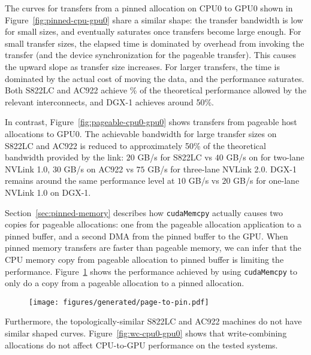 The curves for transfers from a pinned allocation on CPU0 to GPU0 shown in Figure~\ref{fig:pinned-cpu-gpu0} share a similar shape: the transfer bandwidth is low for small sizes, and eventually saturates once transfers become large enough.
For small transfer sizes, the elapsed time is dominated by overhead from invoking the transfer (and the device synchronization for the pageable transfer).
This causes the upward slope as transfer size increases.
For larger transfers, the time is dominated by the actual cost of moving the data, and the performance saturates.
Both S822LC and AC922 achieve \% of the theoretical performance allowed by the relevant interconnects, and DGX-1 achieves around 50\%.


In contrast, Figure~\ref{fig:pageable-cpu0-gpu0} shows transfers from pageable host allocations to GPU0.
The achievable bandwidth for large transfer sizes on S822LC and AC922 is reduced to approximately 50\% of the theoretical bandwidth provided by the link: $20$ GB/s for S822LC vs $40$ GB/s on for two-lane NVLink 1.0, $30$ GB/s on AC922 vs $75$ GB/s for three-lane NVLink 2.0.
DGX-1 remains around the same performance level at $10$ GB/s vs $20$ GB/s for one-lane NVLink 1.0 on DGX-1.

Section~\ref{sec:pinned-memory} describes how \texttt{cudaMemcpy} actually causes two copies for pageable allocations: one from the pageable allocation application to a pinned buffer, and a second DMA from the pinned buffer to the GPU.
When pinned memory transfers are faster than pageable memory, we can infer that the CPU memory copy from pageable allocation to pinned buffer is limiting the performance.
Figure~\ref{fig:explicit-pageable-cpu} shows the performance achieved by using \texttt{cudaMemcpy} to only do a copy from a pageable allocation to a pinned allocation.


\begin{figure}[ht]
    \centering
    \texttt{[image: figures/generated/page-to-pin.pdf]}
    \caption[]{}
    \label{fig:explicit-pageable-cpu}
\end{figure}

Furthermore, the topologically-similar S822LC and AC922 machines do not have similar shaped curves.
Figure~\ref{fig:wc-cpu0-gpu0} shows that write-combining allocations do not affect CPU-to-GPU performance on the tested systems.



